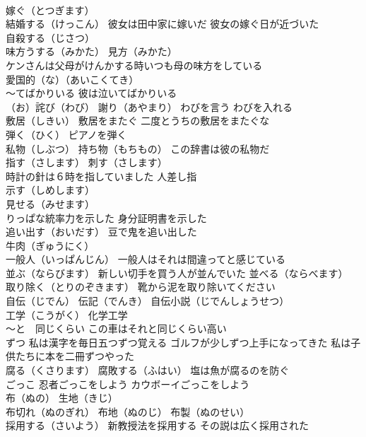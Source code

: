 \documentclass[8pt]{extreport}
\begin{document}
\begin{CJK}{UTF8}{min}
\\	嫁ぐ（とつぎます）
\\	結婚する（けっこん） 彼女は田中家に嫁いだ 彼女の嫁ぐ日が近づいた
\\	自殺する（じさつ）
\\	味方うする（みかた） 見方（みかた） 
\\	ケンさんは父母がけんかする時いつも母の味方をしている
\\	愛国的（な）（あいこくてき）
\\	～てばかりいる 彼は泣いてばかりいる
\\	（お）詫び（わび） 謝り（あやまり） わびを言う わびを入れる
\\	敷居（しきい） 敷居をまたぐ 二度とうちの敷居をまたぐな
\\	弾く（ひく） ピアノを弾く
\\	私物（しぶつ） 持ち物（もちもの） この辞書は彼の私物だ
\\	指す（さします） 刺す（さします）
\\	時計の針は６時を指していました 人差し指
\\	示す（しめします）
\\	見せる（みせます）
\\	りっぱな統率力を示した 身分証明書を示した
\\	追い出す（おいだす） 豆で鬼を追い出した
\\	牛肉（ぎゅうにく）
\\	一般人（いっぱんじん） 一般人はそれは間違ってと感じている
\\	並ぶ（ならびます） 新しい切手を買う人が並んでいた 並べる（ならべます）
\\	取り除く（とりのぞきます） 靴から泥を取り除いてください
\\	自伝（じでん） 伝記（でんき） 自伝小説（じでんしょうせつ）
\\	工学（こうがく） 化学工学
\\	～と　同じくらい この車はそれと同じくらい高い
\\	ずつ 私は漢字を毎日五つずつ覚える ゴルフが少しずつ上手になってきた 私は子供たちに本を二冊ずつやった
\\	腐る（くさります） 腐敗する（ふはい） 塩は魚が腐るのを防ぐ
\\	ごっこ 忍者ごっこをしよう カウボーイごっこをしよう
\\	布（ぬの） 生地（きじ）
\\	布切れ（ぬのぎれ） 布地（ぬのじ） 布製（ぬのせい）
\\	採用する（さいよう） 新教授法を採用する その説は広く採用された

\end{CJK}
\end{document}
